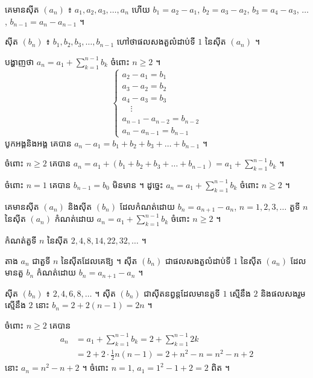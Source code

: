 \begin{formulaBox}[ជាទូទៅ]
គេមានស៊ីត $(a_n)$ ៖ $a_1, a_2, a_3, \ldots, a_n$ ហើយ $b_1 = a_2 - a_1$, $b_2 = a_3 - a_2$, $b_3 = a_4 - a_3$, $\ldots$, $b_{n-1} = a_n - a_{n-1}$ ។

ស៊ីត $(b_n)$ ៖ $b_1, b_2, b_3, \ldots, b_{n-1}$ ហៅថាផលសងតួលំដាប់ទី $1$ នៃស៊ីត $(a_n)$ ។
\end{formulaBox}

\begin{example}[ឧទាហរណ៍ ២]
បង្ហាញថា $a_n = a_1 + \displaystyle\sum_{k=1}^{n-1} b_k$ ចំពោះ $n \ge 2$ ។
\[
\begin{cases}
a_2 - a_1 = b_1\\
a_3 - a_2 = b_2\\
a_4 - a_3 = b_3\\
\quad\vdots\\
a_{n-1} - a_{n-2} = b_{n-2}\\
a_n - a_{n-1} = b_{n-1}
\end{cases}
\]
បូកអង្គនិងអង្គ គេបាន $a_n - a_1 = b_1 + b_2 + b_3 + \ldots + b_{n-1}$ ។

ចំពោះ $n \ge 2$ គេបាន $a_n = a_1 + (b_1 + b_2 + b_3 + \ldots + b_{n-1}) = a_1 + \displaystyle\sum_{k=1}^{n-1} b_k$ ។

ចំពោះ $n = 1$ គេបាន $b_{n-1} = b_0$ មិនមាន ។ ដូច្នេះ $a_n = a_1 + \displaystyle\sum_{k=1}^{n-1} b_k$ ចំពោះ $n \ge 2$ ។
\end{example}

\begin{formulaBox}[ជាទូទៅ]
គេមានស៊ីត $(a_n)$ និងស៊ីត $(b_n)$ ដែលកំណត់ដោយ $b_n = a_{n+1} - a_n$, $n = 1, 2, 3, \ldots$ តួទី $n$ នៃស៊ីត $(a_n)$ កំណត់ដោយ $a_n = a_1 + \displaystyle\sum_{k=1}^{n-1} b_k$ ចំពោះ $n \ge 2$ ។
\end{formulaBox}

\begin{example}[លំហាត់គំរូ ១]
កំណត់តួទី $n$ នៃស៊ីត $2, 4, 8, 14, 22, 32, \ldots$ ។
\end{example}
\ans
តាង $a_n$ ជាតួទី $n$ នៃស៊ីតដែលគេឱ្យ ។ ស៊ីត $(b_n)$ ជាផលសងតួលំដាប់ទី $1$ នៃស៊ីត $(a_n)$ ដែលមានតួ $b_n$ កំណត់ដោយ $b_n = a_{n+1} - a_n$ ។

ស៊ីត $(b_n)$ ៖ $2, 4, 6, 8, \ldots$ ។ ស៊ីត $(b_n)$ ជាស៊ីតនព្វន្តដែលមានតួទី $1$ ស្មើនឹង $2$ និងផលសងរួមស្មើនឹង $2$ នោះ $b_n = 2 + 2(n - 1) = 2n$ ។

ចំពោះ $n \ge 2$ គេបាន
\[
\begin{aligned}
a_n &= a_1 + \sum_{k=1}^{n-1} b_k = 2 + \sum_{k=1}^{n-1} 2k\\
&= 2 + 2 \cdot \frac{1}{2}n(n - 1) = 2 + n^2 - n = n^2 - n + 2
\end{aligned}
\]
នោះ $a_n = n^2 - n + 2$ ។ ចំពោះ $n = 1$, $a_1 = 1^2 - 1 + 2 = 2$ ពិត ។

